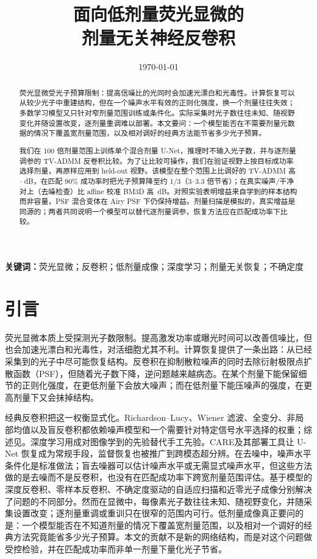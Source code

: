 \documentclass[11pt]{ctexart}
\title{\bfseries 面向低剂量荧光显微的\\剂量无关神经反卷积}
\author{}
\date{\today}
\begin{document}
\maketitle

\begin{abstract}
荧光显微受光子预算限制：提高信噪比的光同时会加速光漂白和光毒性。计算恢复可以从较少光子中重建结构，但在一个噪声水平有效的正则化强度，换一个剂量往往失效；多数学习模型又只针对窄剂量范围训练或条件化。实际采集时光子数往往未知、随视野变化并随设置改变，逐剂量重调难以部署。本文要问：一个模型能否在不需要剂量元数据的情况下覆盖宽剂量范围，以及相对调好的经典方法能节省多少光子预算。

我们在 100 倍剂量范围上训练单个混合剂量 U-Net，推理时不输入光子数，并与逐剂量调参的 TV-ADMM 反卷积比较。为了让比较可操作，我们在验证视野上按目标成功率选择剂量，再原样应用到 held-out 视野。该模型在整个范围上比调好的 TV-ADMM 高 \BestGainMin--\BestGainMax\,dB，在匹配 90\% 成功率时把光子预算降至约 1/3（3--3.3 倍节省）；在真实噪声/干净对上（去噪检查）比 affine 校准 BM3D 高 \RealGain\,dB。对照实验表明增益来自学到的样本结构而非容量，PSF 混合变体在 Airy PSF 下仍保持增益。剂量扫描是模拟的，真实增益是同源的；两者共同说明一个模型可以替代逐剂量调参，恢复方法应在匹配成功率下比较。
\end{abstract}

\noindent\textbf{关键词：}荧光显微；反卷积；低剂量成像；深度学习；剂量无关恢复；不确定度

\section{引言}
荧光显微本质上受探测光子数限制。提高激发功率或曝光时间可以改善信噪比，但也会加速光漂白和光毒性，对活细胞尤其不利\cite{laissue2017phototoxicity}。计算恢复提供了一条出路：从已经采集到的光子中尽可能恢复结构。反卷积在抑制散粒噪声的同时去除衍射极限点扩散函数（PSF），但随着光子数下降，逆问题越来越病态。在某个剂量下能保留细节的正则化强度，在更低剂量下会放大噪声；而在低剂量下能压噪声的强度，在更高剂量下又会抹掉结构。

经典反卷积把这一权衡显式化。Richardson--Lucy\cite{richardson1972,lucy1974}、Wiener 滤波\cite{wiener1949}、全变分\cite{chambolle2004,rudin1992}、非局部均值\cite{buades2005}以及盲反卷积\cite{kundur1996}都依赖噪声模型和一个需要针对特定信号水平选择的权重；综述见\cite{wallace2001}。深度学习用成对图像学到的先验替代手工先验。CARE\cite{weigert2018care}及其部署工具\cite{gomez2021deepimagej}让 U-Net 恢复成为常规手段，监督恢复也被推广到跨模态超分辨\cite{wang2019crossmodality}。在去噪中，噪声水平条件化是标准做法\cite{zhang2018ffdnet}；盲去噪器可以估计噪声水平或无需显式噪声水平\cite{guo2019cbdnet,mohan2020biasfree,krull2019}，但这些方法做的是去噪而不是反卷积，也没有在匹配成功率下跨宽剂量范围评估。基于模型的深度反卷积\cite{liu2020degeneration}、零样本反卷积\cite{qiao2024zsdeconvnet}、不确定度驱动的自适应扫描\cite{ye2025uncertainty}和近零光子成像\cite{sheneman2025nearzero}分别解决了问题的不同部分。然而在显微中，每像素光子数往往未知、随视野变化，并随采集设置改变；逐剂量重调或重训只在很窄的范围内可行。低剂量成像真正要问的是：一个模型能否在不知道剂量的情况下覆盖宽剂量范围，以及相对一个调好的经典方法究竟能省多少光子预算。本文的贡献不是新的网络结构，而是对这个问题做受控检验，并在匹配成功率而非单一剂量下量化光子节省。
\end{document}
